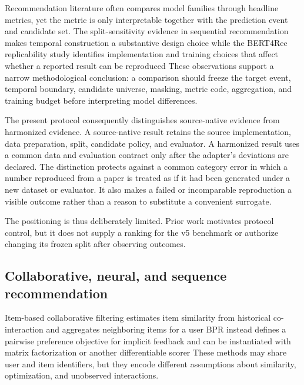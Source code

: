 \documentclass[10pt,a4paper]{article}
\begin{document}
Recommendation literature often compares model families through headline
metrics, yet the metric is only interpretable together with the prediction
event and candidate set. The split-sensitivity evidence in sequential
recommendation makes temporal construction a substantive design choice
\cite{gusak2025_time_split} %
while the BERT4Rec replicability study identifies implementation and training
choices that affect whether a reported result can be reproduced
\cite{petrov2022_a_systematic_review_and_replicability_study_of_bert4rec_fo} %
These observations support a narrow methodological conclusion: a comparison
should freeze the target event, temporal boundary, candidate universe, masking,
metric code, aggregation, and training budget before interpreting model
differences.

The present protocol consequently distinguishes source-native evidence from
harmonized evidence. A source-native result retains the source implementation,
data preparation, split, candidate policy, and evaluator. A harmonized result
uses a common data and evaluation contract only after the adapter's deviations
are declared. The distinction protects against a common category error in which
a number reproduced from a paper is treated as if it had been generated under a
new dataset or evaluator. It also makes a failed or incomparable reproduction a
visible outcome rather than a reason to substitute a convenient surrogate.

The positioning is thus deliberately limited. Prior work motivates protocol
control, but it does not supply a ranking for the v5 benchmark or authorize
changing its frozen split after observing outcomes.

\subsection{Collaborative, neural, and sequence recommendation}

Item-based collaborative filtering estimates item similarity from historical
co-interaction and aggregates neighboring items for a user
\cite{sarwar2001_itemcf} %
BPR instead defines a pairwise preference objective for implicit feedback and
can be instantiated with matrix factorization or another differentiable
scorer
\cite{rendle2009_bpr} %
These methods may share user and item identifiers, but they encode different
assumptions about similarity, optimization, and unobserved interactions.
\end{document}
